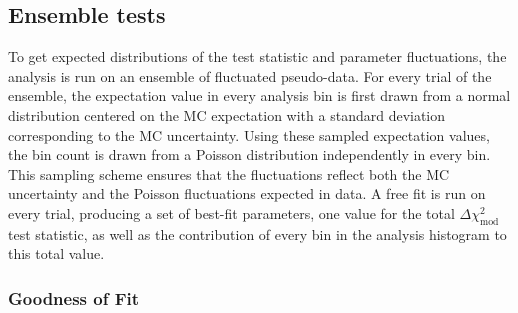 \subsection{Ensemble tests}
\label{sec:three-flavor-ensemble}
To get expected distributions of the test statistic and parameter fluctuations, the analysis is run on an ensemble of fluctuated pseudo-data. For every trial of the ensemble, the expectation value in every analysis bin is first drawn from a normal distribution centered on the MC expectation with a standard deviation corresponding to the MC uncertainty. Using these sampled expectation values, the bin count is drawn from a Poisson distribution independently in every bin. This sampling scheme ensures that the fluctuations reflect both the MC uncertainty and the Poisson fluctuations expected in data. A free fit is run on every trial, producing a set of best-fit parameters, one value for the total $\Delta \chi^2_{\mathrm{mod}}$ test statistic, as well as the contribution of every bin in the analysis histogram to this total value.



\subsubsection{Goodness of Fit}

